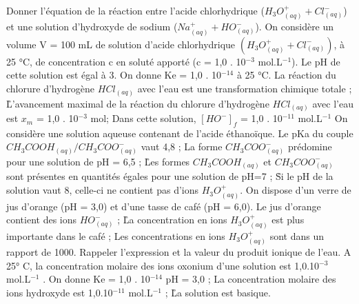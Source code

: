 \q	
Donner l’équation de la réaction entre l’acide chlorhydrique ($H_3O^+_{(aq)} + Cl^{-}_{(aq)}$) et une solution d’hydroxyde de sodium ($Na^{+}_{(aq)} + HO^{-}_{(aq)}$).
  \q	
On considère un volume V = 100 mL de solution d'acide chlorhydrique $(H_3O^+_{(aq)} + Cl^-_{(aq)})$, à 25 °C, de concentration c en soluté apporté (c = 1,0 . 10$^{-3}$ mol.L$^{-1}$). Le pH de cette solution est égal à 3. 
On donne Ke = 1,0 . 10$^{-14}$ à 25 °C.
\rv
La réaction du chlorure d'hydrogène $HCl_{(aq)}$ avec l'eau est une transformation chimique totale ;
\r
L'avancement maximal de la réaction du chlorure d’hydrogène $HCl_{(aq)}$ avec l'eau est $x_m$ = 1,0 . 10$^{-3}$ mol;
\rv
Dans cette solution, $[HO^{-}]_f$ = 1,0 . 10$^{-11}$ mol.L$^{-1}$   
 \q	
On considère une solution aqueuse contenant de l’acide éthanoïque.
Le pKa du couple $CH_3COOH_{(aq)}/ CH_3COO^{-}_{(aq)}$  vaut 4,8 ;
\rv
La forme $CH_3COO^{-}_{(aq)}$  prédomine  pour une solution de pH = 6,5 ;
\r
Les formes $CH_3COOH_{(aq)}$ et $CH_3COO^{-}_{(aq)}$ sont présentes en quantités égales pour une solution de pH=7 ;
\r
Si le pH de la solution vaut 8, celle-ci ne contient pas d’ions $H_3O^+_{(aq)}$.
\q
On dispose d’un verre de jus d’orange (pH = 3,0) et d’une tasse de café (pH = 6,0). 
\rv
Le jus d’orange contient des ions $HO^{-}_{(aq)}$ ; 
\r
La concentration en ions $H_3O^+_{(aq)}$  est plus importante dans le café ;
\rv
Les concentrations en ions $H_3O^+_{(aq)}$ sont dans un rapport de  1000.
\q
Rappeler l’expression et la valeur du produit ionique de l’eau.
 \q	
A 25° C, la concentration molaire des ions oxonium d’une solution est 1,0.10$^{-3}$ mol.L$^{-1}$ . 
On donne Ke = 1,0 . 10$^{-14}$ 
\rv
pH = 3,0 ;
\rv La concentration molaire des ions hydroxyde est 1,0.10$^{-11}$ mol.L$^{-1}$ ;
\r
La solution est basique.

